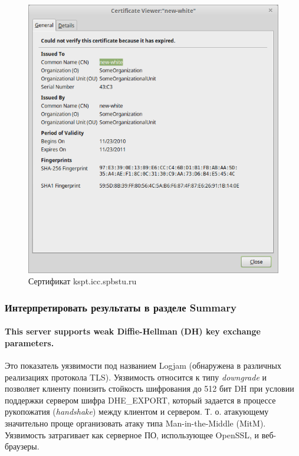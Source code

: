 \begin{figure}[h!]
\centering
\includegraphics[scale=0.8]{res/pic001}
\caption{Сертификат kspt.icc.spbstu.ru}
\end{figure}

\subsubsection{Интерпретировать результаты в разделе Summary}

\paragraph{This server supports weak Diffie-Hellman (DH) key exchange parameters.}

Это показатель уязвимости под названием Logjam (обнаружена в различных реализациях протокола TLS). Уязвимость относится к типу \textit{downgrade} и позволяет клиенту понизить стойкость шифрования до 512 бит DH при условии поддержки сервером шифра DHE\_EXPORT, который задается в процессе рукопожатия (\textit{handshake}) между клиентом и сервером. Т. о. атакующему значительно проще организовать атаку типа Man-in-the-Middle (MitM). Уязвимость затрагивает как серверное ПО, использующее OpenSSL, и веб-браузеры.

